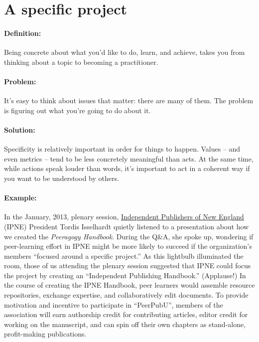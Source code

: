 \section{A specific project}
\paragraph{Definition:} Being concrete about what you'd like to do, learn,
and achieve, takes you from thinking about a topic to becoming a
practitioner.

\paragraph{Problem:} It's easy to think about issues that matter: there are
many of them. The problem is figuring out what you're going to do about
it.

\paragraph{Solution:} Specificity is relatively important in order for
things to happen. Values -- and even metrics -- tend to be less
concretely meaningful than acts. At the same time, while actions speak
louder than words, it's important to act in a coherent way if you want
to be understood by others.

\paragraph{Example:} In the January, 2013, plenary
session, \href{http://ipne.org}{Independent Publishers of New England}
(IPNE) President Tordis Isselhardt quietly listened to a presentation
about how we created the \emph{Peeragogy Handbook}. During the Q\&A, she
spoke up, wondering if peer-learning effort in IPNE might be more likely
to succeed if the organization's members ``focused around a specific
project.'' As this lightbulb illuminated the room, those of us attending
the plenary session suggested that IPNE could focus the project by
creating an ``Independent Publishing Handbook.'' (Applause!) In the
course of creating the IPNE Handbook, peer learners would assemble
resource repositories, exchange expertise, and collaboratively edit
documents. To provide motivation and incentive to participate in
``PeerPubU'', members of the association will earn authorship credit for
contributing articles, editor credit for working on the manuscript, and
can spin off their own chapters as stand-alone, profit-making
publications.

